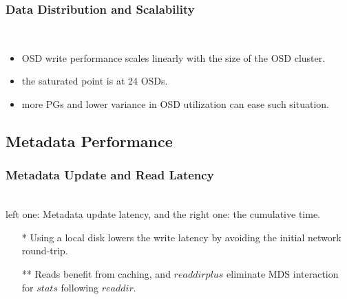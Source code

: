 \documentclass[cjk,slidestop,mathserif]{beamer}
\begin{document}
\begin{CJK}{UTF8}{gkai}
% 

\begin{frame}
 \frametitle{Data Distribution and Scalability}
  \\
 \begin{itemize}
  \item OSD write performance scales linearly with the size of the OSD cluster.
  \item the saturated point is at 24 OSDs.
  \item more PGs and lower variance in OSD utilization can ease such situation.
 \end{itemize}
\end{frame}

\subsection{Metadata Performance}
\begin{frame}
 \frametitle{Metadata Update and Read Latency}
 \vspace{4pt}
  \\
 left one: Metadata update latency, and the right one: the cumulative time. \\
 \begin{itemize}
  \item[*] Using a local disk lowers the write latency by avoiding the initial network round-trip.
  \item[**] Reads benefit from caching, and $readdirplus$ eliminate MDS interaction for $stats$ following $readdir$. 
 \end{itemize}
\end{frame}


\end{CJK}
\end{document}

